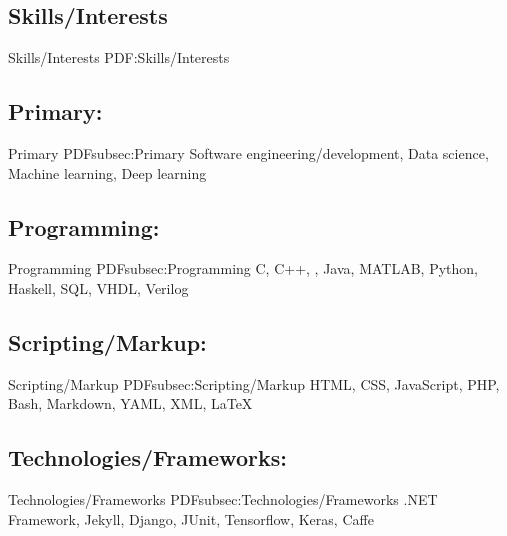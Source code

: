 \documentclass[a4paper,10pt,oneside]{article}
\begin{document}
\begin{body}





\section
{Skills/Interests}
{Skills/Interests}
{PDF:Skills/Interests}
\subsection
{Primary:}
{Primary}
{PDFsubsec:Primary}
Software engineering/development, Data science, Machine learning, Deep learning
\vspace{15pt}
\subsection
{Programming:}
{Programming}
{PDFsubsec:Programming}
C, C++, \Csharp, Java, MATLAB, Python, Haskell, SQL, VHDL, Verilog
\vspace{15pt}
\subsection
{Scripting/Markup:}
{Scripting/Markup}
{PDFsubsec:Scripting/Markup}
HTML, CSS, JavaScript, PHP, Bash, Markdown, YAML, XML, \LaTeX
\vspace{15pt}
\subsection
{Technologies/Frameworks:}
{Technologies/Frameworks}
{PDFsubsec:Technologies/Frameworks}
.NET Framework, Jekyll, Django, JUnit, Tensorflow, Keras, Caffe
\vspace{15pt}

\end{body}
\end{document}
